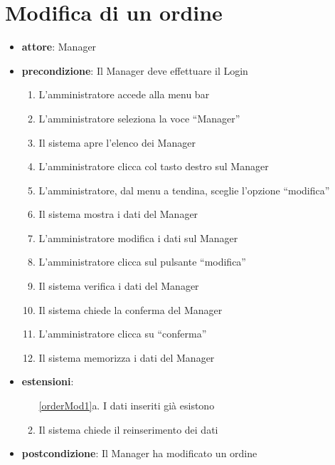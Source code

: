 \section{Modifica di un ordine}
\begin{itemize}
    \item \textbf{attore}: Manager
    \item \textbf{precondizione}: Il Manager deve effettuare il Login

    \begin{enumerate}
        \item L’amministratore accede alla menu bar
        \item L’amministratore seleziona la voce “Manager”
        \item Il sistema apre l’elenco dei Manager
        \item L’amministratore clicca col tasto destro sul Manager
        \item L’amministratore, dal menu a tendina, sceglie l’opzione “modifica”
        \item Il sistema mostra i dati del Manager
        \item L’amministratore modifica i dati sul Manager
        \item L’amministratore clicca sul pulsante “modifica”
        \label{orderMod1}
        \item Il sistema verifica i dati del Manager
        \item Il sistema chiede la conferma del Manager
        \item L’amministratore clicca su “conferma”
        \item Il sistema memorizza i dati del Manager
    \end{enumerate}

    \item \textbf{estensioni}:
    \begin{enumerate}
        \item[\ref{orderMod1}a.] I dati inseriti già esistono
        \item Il sistema chiede il reinserimento dei dati
    \end{enumerate}

    \item \textbf{postcondizione}: Il Manager ha modificato un ordine
\end{itemize}


